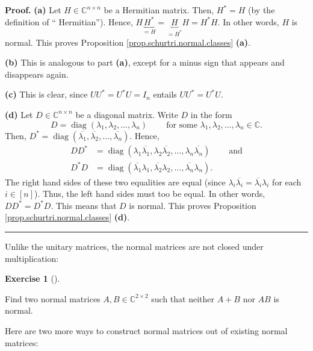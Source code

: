 \documentclass[numbers=enddot,12pt,final,onecolumn,notitlepage]{scrartcl}%
\newcounter{exer}
\numberwithin{exer}{subsection}
\theoremstyle{definition}
\newtheorem{exmp}[exer]{Exercise}
\newenvironment{exercise}[1][]
{\begin{exmp}[#1]\begin{leftbar}}
{\end{leftbar}\end{exmp}}
\newenvironment{proof}[1][Proof]{\noindent\textbf{#1.} }{\ \rule{0.5em}{0.5em}}
\begin{document}
\begin{proof}
\textbf{(a)} Let $H\in\mathbb{C}^{n\times n}$ be a Hermitian matrix. Then,
$H^{\ast}=H$ (by the definition of \textquotedblleft
Hermitian\textquotedblright). Hence, $H\underbrace{H^{\ast}}_{=H}%
=\underbrace{H}_{=H^{\ast}}H=H^{\ast}H$. In other words, $H$ is normal. This
proves Proposition \ref{prop.schurtri.normal.classes} \textbf{(a)}. \medskip

\textbf{(b)} This is analogous to part \textbf{(a)}, except for a minus sign
that appears and disappears again. \medskip

\textbf{(c)} This is clear, since $UU^{\ast}=U^{\ast}U=I_{n}$ entails
$UU^{\ast}=U^{\ast}U$. \medskip

\textbf{(d)} Let $D\in\mathbb{C}^{n\times n}$ be a diagonal matrix. Write $D$
in the form
\[
D=\operatorname*{diag}\left(  \lambda_{1},\lambda_{2},\ldots,\lambda
_{n}\right)  \ \ \ \ \ \ \ \ \ \ \text{for some }\lambda_{1},\lambda
_{2},\ldots,\lambda_{n}\in\mathbb{C}.
\]
Then, $D^{\ast}=\operatorname*{diag}\left(  \overline{\lambda_{1}}%
,\overline{\lambda_{2}},\ldots,\overline{\lambda_{n}}\right)  $. Hence,
\begin{align*}
DD^{\ast}  &  =\operatorname*{diag}\left(  \lambda_{1}\overline{\lambda_{1}%
},\lambda_{2}\overline{\lambda_{2}},\ldots,\lambda_{n}\overline{\lambda_{n}%
}\right)  \ \ \ \ \ \ \ \ \ \ \text{and}\\
D^{\ast}D  &  =\operatorname*{diag}\left(  \overline{\lambda_{1}}\lambda
_{1},\overline{\lambda_{2}}\lambda_{2},\ldots,\overline{\lambda_{n}}%
\lambda_{n}\right)  .
\end{align*}
The right hand sides of these two equalities are equal (since $\lambda
_{i}\overline{\lambda_{i}}=\overline{\lambda_{i}}\lambda_{i}$ for each
$i\in\left[  n\right]  $). Thus, the left hand sides must too be equal. In
other words, $DD^{\ast}=D^{\ast}D$. This means that $D$ is normal. This proves
Proposition \ref{prop.schurtri.normal.classes} \textbf{(d)}.
\end{proof}

Unlike the unitary matrices, the normal matrices are not closed under multiplication:

\begin{exercise}
\label{exe.schurtri.normal.not-additive} Find two normal matrices
$A,B\in\mathbb{C}^{2\times2}$ such that neither $A+B$ nor $AB$ is normal.
\end{exercise}

Here are two more ways to construct normal matrices out of existing normal matrices:
\end{document}
